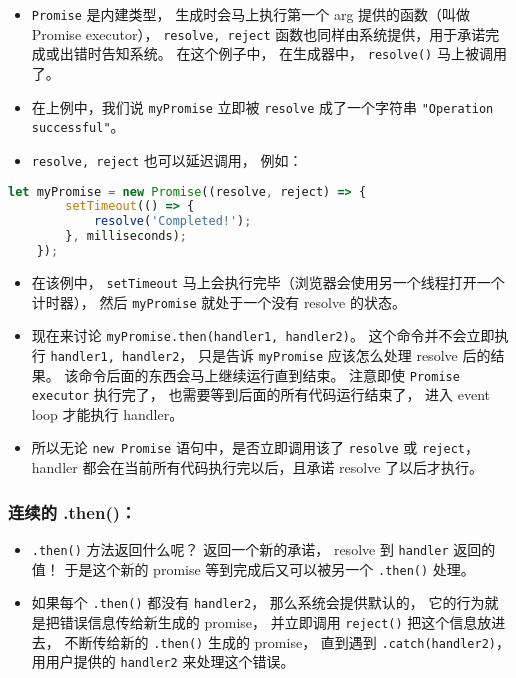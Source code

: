 \begin{itemize}
\item \verb`Promise` 是内建类型， 生成时会马上执行第一个 arg 提供的函数（叫做 Promise executor）， \verb`resolve, reject` 函数也同样由系统提供，用于承诺完成或出错时告知系统。 在这个例子中， 在生成器中， \verb`resolve()` 马上被调用了。
\item 在上例中，我们说 \verb`myPromise` 立即被 \verb`resolve` 成了一个字符串 \verb`"Operation successful"`。
\item \verb`resolve, reject` 也可以延迟调用， 例如：
\end{itemize}
\begin{lstlisting}[language=js]
let myPromise = new Promise((resolve, reject) => {
        setTimeout(() => {
            resolve('Completed!');
        }, milliseconds);
    });
\end{lstlisting}
\begin{itemize}
\item 在该例中， \verb`setTimeout` 马上会执行完毕（浏览器会使用另一个线程打开一个计时器）， 然后 \verb`myPromise` 就处于一个没有 resolve 的状态。
\end{itemize}
\begin{itemize}
\item 现在来讨论 \verb`myPromise.then(handler1, handler2)`。 这个命令并不会立即执行 \verb`handler1, handler2`， 只是告诉 \verb`myPromise` 应该怎么处理 resolve 后的结果。 该命令后面的东西会马上继续运行直到结束。 注意即使 \verb`Promise executor` 执行完了， 也需要等到后面的所有代码运行结束了， 进入 event loop 才能执行 handler。
\item 所以无论 \verb`new Promise` 语句中，是否立即调用该了 \verb`resolve` 或 \verb`reject`， handler 都会在当前所有代码执行完以后，且承诺 resolve 了以后才执行。
\end{itemize}

\subsubsection{连续的 .then()：}
\begin{itemize}
\item \verb`.then()` 方法返回什么呢？ 返回一个新的承诺， resolve 到 \verb`handler` 返回的值！ 于是这个新的 promise 等到完成后又可以被另一个 \verb`.then()` 处理。
\item 如果每个 \verb`.then()` 都没有 \verb`handler2`， 那么系统会提供默认的， 它的行为就是把错误信息传给新生成的 promise， 并立即调用 \verb`reject()` 把这个信息放进去， 不断传给新的 \verb`.then()` 生成的 promise， 直到遇到 \verb`.catch(handler2)`， 用用户提供的 \verb`handler2` 来处理这个错误。
\end{itemize}
